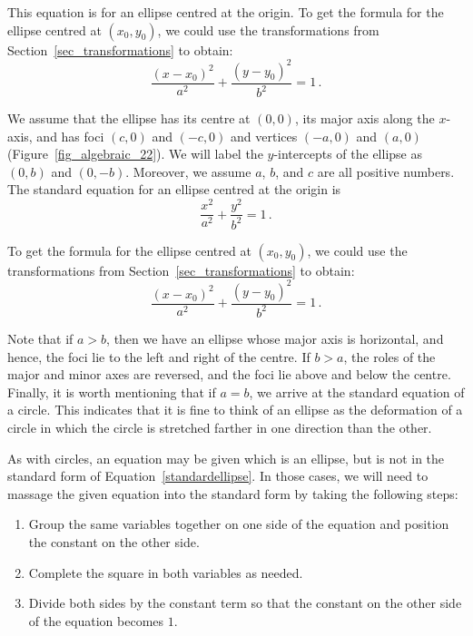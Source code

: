 \medskip

This equation is for an ellipse centred at the origin. To get the formula for the ellipse centred at $(x_0,y_0)$, we could use the transformations from Section~\ref{sec_transformations} to obtain:
\begin{equation}
\dfrac{(x-x_0)^2}{a^2} + \dfrac{(y-y_0)^2}{b^2} = 1\,.
\label{standardellipse}
\end{equation}

\fi

\ifvc
We assume that the ellipse has its centre at $(0,0)$, its major axis along the $x$-axis, and has foci $(c,0)$ and $(-c,0)$ and vertices $(-a,0)$ and $(a,0)$ (Figure~\ref{fig_algebraic_22}).  We will label the $y$-intercepts of the ellipse as $(0,b)$ and $(0,-b)$. Moreover, we assume $a$, $b$, and $c$ are all positive numbers.
The standard equation for an ellipse centred at the origin is
\[ \dfrac{x^2}{a^2} + \dfrac{y^2}{b^2}  = 1\,.\]

\medskip

To get the formula for the ellipse centred at $(x_0,y_0)$, we could use the transformations from Section~\ref{sec_transformations} to obtain:
\begin{equation}
\dfrac{(x-x_0)^2}{a^2} + \dfrac{(y-y_0)^2}{b^2} = 1\,.
\label{standardellipse}
\end{equation}
\fi

Note that if $a > b$, then we have an ellipse whose major axis is horizontal, and hence, the foci lie to the left and right of the centre.   If $b > a$, the roles of the major and minor axes are reversed, and the foci lie above and below the centre.  Finally, it is worth mentioning that if $a=b$, we arrive at the standard equation of a circle. This indicates that it is fine to think of an ellipse as the deformation of a circle in which the circle is stretched farther in one direction than the other.


As with circles, an equation may be given which is an ellipse, but is not in the standard form of Equation~\eqref{standardellipse}.  In those cases,  we will need to massage the given equation into the standard form by taking the following steps:

\begin{enumerate}

\item  Group the same variables together on one side of the equation and position the constant on the other side.

\item  Complete the square in both variables as needed.

\item  Divide both sides by the constant term so that the constant on the other side of the equation becomes $1$.

\end{enumerate}



